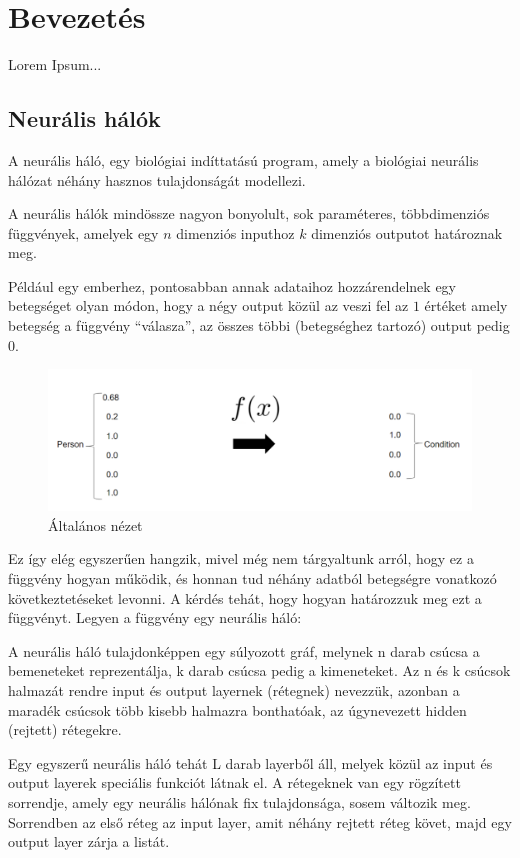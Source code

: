 \documentclass[12pt]{article}
\begin{document}
\section{Bevezetés}

Lorem Ipsum...

\subsection{Neurális hálók}

A neurális háló, egy biológiai indíttatású program, amely a biológiai neurális hálózat néhány hasznos tulajdonságát modellezi.

A neurális hálók mindössze nagyon bonyolult, sok paraméteres, többdimenziós függvények, amelyek egy $n$ dimenziós inputhoz $k$ dimenziós outputot határoznak meg.

Például egy emberhez, pontosabban annak adataihoz hozzárendelnek egy betegséget olyan módon, hogy a négy output közül az veszi fel az $1$ értéket amely betegség a függvény “válasza”, az összes többi (betegséghez tartozó) output pedig $0$.

\begin{figure}[h!]
  \includegraphics[width=\linewidth]{fgv.png}
  \caption{Általános nézet}
\end{figure}

Ez így elég egyszerűen hangzik, mivel még nem tárgyaltunk arról, hogy ez a függvény hogyan működik, és honnan tud néhány adatból betegségre vonatkozó következtetéseket levonni. A kérdés tehát, hogy hogyan határozzuk meg ezt a függvényt. Legyen a függvény egy neurális háló:

A neurális háló tulajdonképpen egy súlyozott gráf, melynek n darab csúcsa a bemeneteket reprezentálja, k darab csúcsa pedig a kimeneteket. Az n és k csúcsok halmazát rendre input és output layernek (rétegnek) nevezzük, azonban a maradék csúcsok több kisebb halmazra bonthatóak, az úgynevezett hidden (rejtett) rétegekre. 

Egy egyszerű neurális háló tehát L darab layerből áll, melyek közül az input és output layerek speciális funkciót látnak el. A rétegeknek van egy rögzített sorrendje, amely egy neurális hálónak fix tulajdonsága, sosem változik meg. Sorrendben az első réteg az input layer, amit néhány rejtett réteg követ, majd egy output layer zárja a listát.
\end{document}
